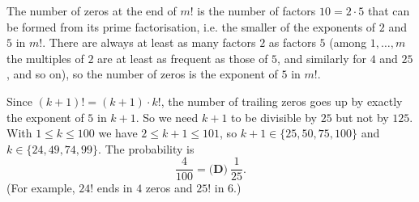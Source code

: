 The number of zeros at the end of $m!$ is the number of factors $10=2\cdot5$ that can be formed from its prime factorisation, i.e. the smaller of the exponents of $2$ and $5$ in $m!$. There are always at least as many factors $2$ as factors $5$ (among $1,\dots,m$ the multiples of $2$ are at least as frequent as those of $5$, and similarly for $4$ and $25$, and so on), so the number of zeros is the exponent of $5$ in $m!$.

Since $(k+1)!=(k+1)\cdot k!$, the number of trailing zeros goes up by exactly the exponent of $5$ in $k+1$. So we need $k+1$ to be divisible by $25$ but not by $125$. With $1\le k\le100$ we have $2\le k+1\le101$, so $k+1\in\{25,50,75,100\}$ and $k\in\{24,49,74,99\}$. The probability is
\[\dfrac{4}{100}=\boxed{\textbf{(D)}\ \dfrac{1}{25}}.\]
(For example, $24!$ ends in $4$ zeros and $25!$ in $6$.)
